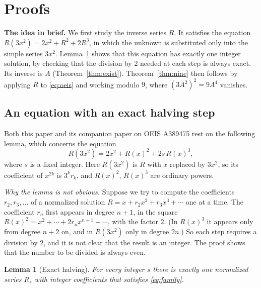 \documentclass[11pt,a4paper]{article}
\newtheorem{lemma}[theorem]{Lemma}
\theoremstyle{definition}
\theoremstyle{remark}
\newcommand{\para}[1]{\par\medskip\noindent\textbf{#1}\enspace}
\begin{document}
\section{Proofs}\label{sec:proofs}

\para{The idea in brief.} We first study the inverse series $R$. It satisfies the equation $R(3x^2)=2x^2+R^2+2R^3$, in which the unknown is
substituted only into the simple series $3x^2$. Lemma~\ref{lem:family} shows that this equation has exactly one integer
solution, by checking that the division by $2$ needed at each step is always exact. Its inverse is $A$
(Theorem~\ref{thm:exist}). Theorem~\ref{thm:nine} then follows by applying $R$ to \eqref{eq:oeis} and working
modulo $9$, where $(3A^2)^2=9A^4$ vanishes.

\subsection{An equation with an exact halving step}
Both this paper and its companion paper on OEIS A389475 rest on the following lemma, which concerns the
equation
\begin{equation}\label{eq:family}
R(3x^2)=2x^2+R(x)^2+2s\,R(x)^3 ,
\end{equation}
where $s$ is a fixed integer. Here $R(3x^2)$ is $R$ with $x$ replaced by $3x^2$, so its coefficient of $x^{2k}$ is
$3^kr_k$, and $R(x)^2$, $R(x)^3$ are ordinary powers.

\emph{Why the lemma is not obvious.} Suppose we try to compute the coefficients $r_2,r_3,\dots$ of a normalized
solution $R=x+r_2x^2+r_3x^3+\cdots$ one at a time. The coefficient $r_n$ first appears in degree $n+1$, in the square
$R(x)^2=x^2+\cdots+2r_nx^{n+1}+\cdots$, with the factor $2$. (In $R(x)^3$ it appears only from degree $n+2$ on, and in
$R(3x^2)$ only in degree $2n$.) So each step requires a division by $2$, and it is not clear that the result is an
integer. The proof shows that the number to be divided is always even.

\begin{lemma}[Exact halving]\label{lem:family}
For every integer $s$ there is exactly one normalized series $R_s$ with integer coefficients that satisfies
\eqref{eq:family}.
\end{lemma}
\end{document}

